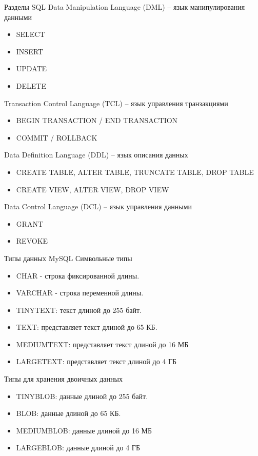 \documentclass{beamer}
\begin{document}
\begin{frame}{Разделы SQL}
Data Manipulation Language (DML) – язык манипулирования данными
\begin{itemize}
\item SELECT
\item INSERT
\item UPDATE
\item DELETE
\end{itemize}
Transaction Control Language (TCL) – язык управления транзакциями
\begin{itemize}
\item BEGIN TRANSACTION / END TRANSACTION
\item COMMIT / ROLLBACK
\end{itemize}
Data Definition Language (DDL) – язык описания данных
\begin{itemize}
\item CREATE TABLE, ALTER TABLE, TRUNCATE TABLE, DROP TABLE
\item CREATE VIEW, ALTER VIEW, DROP VIEW
\end{itemize}
Data Control Language (DCL) – язык управления данными
\begin{itemize}
\item GRANT
\item REVOKE
\end{itemize}
\end{frame}

\begin{frame}{Типы данных MySQL}
Символьные типы
\begin{itemize}
\item CHAR - строка фиксированной длины.
\item VARCHAR - строка переменной длины.
\item TINYTEXT: текст длиной до 255 байт.
\item TEXT: представляет текст длиной до 65 КБ.
\item MEDIUMTEXT: представляет текст длиной до 16 МБ
\item LARGETEXT: представляет текст длиной до 4 ГБ
\end{itemize}
Типы для хранения двоичных данных
\begin{itemize}
\item TINYBLOB: данные длиной до 255 байт.
\item BLOB: данные длиной до 65 КБ.
\item MEDIUMBLOB: данные длиной до 16 МБ
\item LARGEBLOB: данные длиной до 4 ГБ
\end{itemize}
\end{frame}
\end{document}
